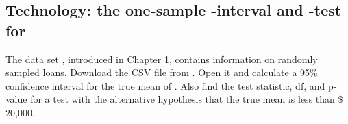 \subsection[Technology: the one-sample $t$-interval and $t$-test for $\mu$]{Technology: the one-sample -interval and -test for \pmb{$\mu$}}
\label{tech1T}

\noindent The data set , introduced in Chapter 1, contains information on randomly sampled loans.  Download the  CSV file from .  Open it and calculate a 95\% confidence interval for the true mean of .  Also find the test statistic, df, and p-value for a test with the alternative hypothesis that the true mean is less than $\$$20,000.\\

